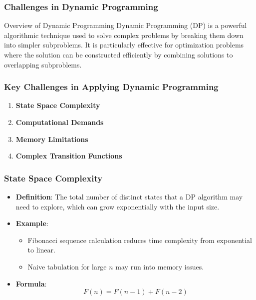 \documentclass[aspectratio=169]{beamer}
\begin{document}
\begin{frame}[fragile]
    \frametitle{Challenges in Dynamic Programming}
    \begin{block}{Overview of Dynamic Programming}
        Dynamic Programming (DP) is a powerful algorithmic technique used to solve complex problems by breaking them down into simpler subproblems. It is particularly effective for optimization problems where the solution can be constructed efficiently by combining solutions to overlapping subproblems.
    \end{block}
\end{frame}

\begin{frame}[fragile]
    \frametitle{Key Challenges in Applying Dynamic Programming}
    \begin{enumerate}
        \item \textbf{State Space Complexity}
        \item \textbf{Computational Demands}
        \item \textbf{Memory Limitations}
        \item \textbf{Complex Transition Functions}
    \end{enumerate}
\end{frame}

\begin{frame}[fragile]
    \frametitle{State Space Complexity}
    \begin{itemize}
        \item \textbf{Definition}: The total number of distinct states that a DP algorithm may need to explore, which can grow exponentially with the input size.
        \item \textbf{Example}: 
            \begin{itemize}
                \item Fibonacci sequence calculation reduces time complexity from exponential to linear.
                \item Naive tabulation for large \( n \) may run into memory issues.
            \end{itemize}
        \item \textbf{Formula}: 
            \[
            F(n) = F(n-1) + F(n-2)
            \]
    \end{itemize}
\end{frame}
\end{document}
